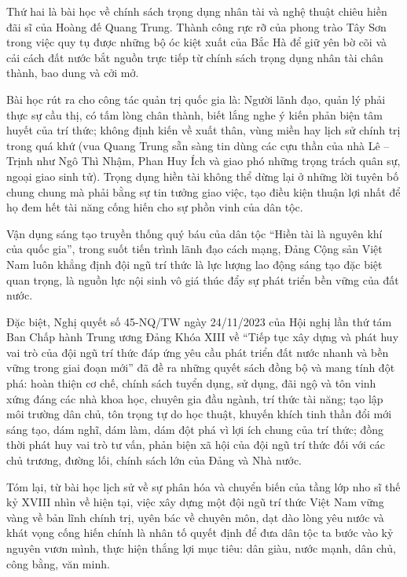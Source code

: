 Thứ hai là bài học về chính sách trọng dụng nhân tài và nghệ thuật chiêu hiền đãi sĩ của Hoàng đế Quang Trung. Thành công rực rỡ của phong trào Tây Sơn trong việc quy tụ được những bộ óc kiệt xuất của Bắc Hà để giữ yên bờ cõi và cải cách đất nước bắt nguồn trực tiếp từ chính sách trọng dụng nhân tài chân thành, bao dung và cởi mở.

Bài học rút ra cho công tác quản trị quốc gia là: Người lãnh đạo, quản lý phải thực sự cầu thị, có tấm lòng chân thành, biết lắng nghe ý kiến phản biện tâm huyết của trí thức; không định kiến về xuất thân, vùng miền hay lịch sử chính trị trong quá khứ (vua Quang Trung sẵn sàng tin dùng các cựu thần của nhà Lê -- Trịnh như Ngô Thì Nhậm, Phan Huy Ích và giao phó những trọng trách quân sự, ngoại giao sinh tử). Trọng dụng hiền tài không thể dừng lại ở những lời tuyên bố chung chung mà phải bằng sự tin tưởng giao việc, tạo điều kiện thuận lợi nhất để họ đem hết tài năng cống hiến cho sự phồn vinh của dân tộc.

Vận dụng sáng tạo truyền thống quý báu của dân tộc ``Hiền tài là nguyên khí của quốc gia'', trong suốt tiến trình lãnh đạo cách mạng, Đảng Cộng sản Việt Nam luôn khẳng định đội ngũ trí thức là lực lượng lao động sáng tạo đặc biệt quan trọng, là nguồn lực nội sinh vô giá thúc đẩy sự phát triển bền vững của đất nước.

Đặc biệt, Nghị quyết số 45-NQ/TW ngày 24/11/2023 của Hội nghị lần thứ tám Ban Chấp hành Trung ương Đảng Khóa XIII về ``Tiếp tục xây dựng và phát huy vai trò của đội ngũ trí thức đáp ứng yêu cầu phát triển đất nước nhanh và bền vững trong giai đoạn mới'' đã đề ra những quyết sách đồng bộ và mang tính đột phá: hoàn thiện cơ chế, chính sách tuyển dụng, sử dụng, đãi ngộ và tôn vinh xứng đáng các nhà khoa học, chuyên gia đầu ngành, trí thức tài năng; tạo lập môi trường dân chủ, tôn trọng tự do học thuật, khuyến khích tinh thần đổi mới sáng tạo, dám nghĩ, dám làm, dám đột phá vì lợi ích chung của trí thức; đồng thời phát huy vai trò tư vấn, phản biện xã hội của đội ngũ trí thức đối với các chủ trương, đường lối, chính sách lớn của Đảng và Nhà nước.

Tóm lại, từ bài học lịch sử về sự phân hóa và chuyển biến của tầng lớp nho sĩ thế kỷ XVIII nhìn về hiện tại, việc xây dựng một đội ngũ trí thức Việt Nam vững vàng về bản lĩnh chính trị, uyên bác về chuyên môn, dạt dào lòng yêu nước và khát vọng cống hiến chính là nhân tố quyết định để đưa dân tộc ta bước vào kỷ nguyên vươn mình, thực hiện thắng lợi mục tiêu: dân giàu, nước mạnh, dân chủ, công bằng, văn minh.

